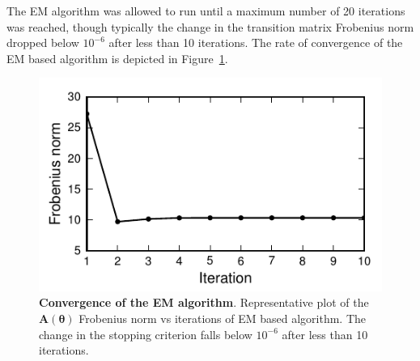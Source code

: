 \documentclass[11pt,draftcls,onecolumn,peerreview]{IEEEtran}
\begin{document}
The EM algorithm was allowed to run until a maximum number of 20 iterations was reached, though typically the change in the transition matrix Frobenius norm dropped below $10^{-6}$ after less than 10 iterations. The rate of convergence of the EM based algorithm is depicted in Figure~\ref{fig:MRA-Convergence}. 
\begin{figure}[!t] 
 	\centering
 		\includegraphics[scale=1]{./Graph/ConvergenceRate.pdf}
 		\caption{{\bf Convergence of the EM algorithm}. Representative plot of
the $\mathbf A(\boldsymbol\theta)$ Frobenius norm vs iterations of EM based algorithm. The change in the stopping criterion falls below $10^{-6}$ after less than 10 iterations.}
 	\label{fig:MRA-Convergence}
 \end{figure}     
\end{document}
